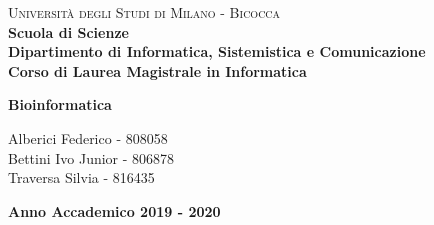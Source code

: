 \documentclass[a4paper,10pt]{article}
\begin{document}
\begin{titlepage}
\noindent
    \vspace*{5mm}
	\begin{minipage}[t]{0.15\textwidth}
	    \vspace*{5mm}
	\end{minipage}
	\hspace{1cm}
	\begin{minipage}[t]{0.90\textwidth}
	      \vspace*{5mm}
		{
			{\textsc{Università degli Studi di Milano - Bicocca} } \\
			\textbf{Scuola di Scienze} \\
			\textbf{Dipartimento di Informatica, Sistemistica e Comunicazione} \\
			\textbf{Corso di Laurea Magistrale in Informatica} \\
			\par
		}
	\end{minipage}
	
	\vspace{42mm}

\begin{center}
    {\LARGE{
    
            \textbf{Bioinformatica\\ }
    }}        
\end{center}

\vspace{40mm}
	
	
	\begin{flushright}
		\large{Alberici Federico - 808058\\} 
		\large{Bettini Ivo Junior - 806878\\} 
		\large{Traversa Silvia - 816435} 
	\end{flushright}
	
	\vspace{15mm}
	\begin{center}
		{\large{\bf Anno Accademico 2019 - 2020}}
	\end{center}


\end{titlepage}
\end{document}
